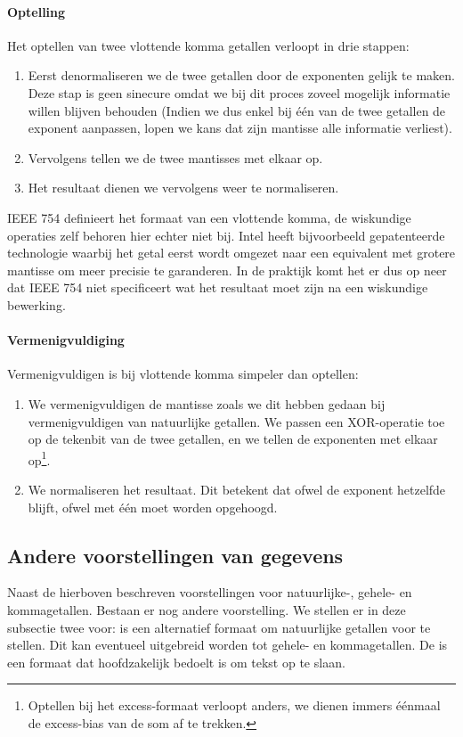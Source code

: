 \paragraph{Optelling}
Het optellen van twee vlottende komma getallen verloopt in drie stappen:
\begin{enumerate}
 \item Eerst denormaliseren we de twee getallen door de exponenten gelijk te maken. Deze stap is geen sinecure omdat we bij dit proces zoveel mogelijk informatie willen blijven behouden (Indien we dus enkel bij \'e\'en van de twee getallen de exponent aanpassen, lopen we kans dat zijn mantisse alle informatie verliest).
 \item Vervolgens tellen we de twee mantisses met elkaar op.
 \item Het resultaat dienen we vervolgens weer te normaliseren.
\end{enumerate}
IEEE 754 definieert het formaat van een vlottende komma, de wiskundige operaties zelf behoren hier echter niet bij. Intel heeft bijvoorbeeld gepatenteerde technologie waarbij het getal eerst wordt omgezet naar een equivalent met grotere mantisse om meer precisie te garanderen. In de praktijk komt het er dus op neer dat IEEE 754 niet specificeert wat het resultaat moet zijn na een wiskundige bewerking.
\paragraph{Vermenigvuldiging}
Vermenigvuldigen is bij vlottende komma simpeler dan optellen:
\begin{enumerate}
 \item We vermenigvuldigen de mantisse zoals we dit hebben gedaan bij vermenigvuldigen van natuurlijke getallen. We passen een XOR-operatie toe op de tekenbit van de twee getallen, en we tellen de exponenten met elkaar op\footnote{Optellen bij het excess-formaat verloopt anders, we dienen immers \'e\'enmaal de excess-bias van de som af te trekken.}.
 \item We normaliseren het resultaat. Dit betekent dat ofwel de exponent hetzelfde blijft, ofwel met \'e\'en moet worden opgehoogd.
\end{enumerate}
\subsection{Andere voorstellingen van gegevens}
\label{ss:otherRepresentations}
Naast de hierboven beschreven voorstellingen voor natuurlijke-, gehele- en kommagetallen. Bestaan er nog andere voorstelling. We stellen er in deze subsectie twee voor:  is een alternatief formaat om natuurlijke getallen voor te stellen. Dit kan eventueel uitgebreid worden tot gehele- en kommagetallen. De  is een formaat dat hoofdzakelijk bedoelt is om tekst op te slaan.
